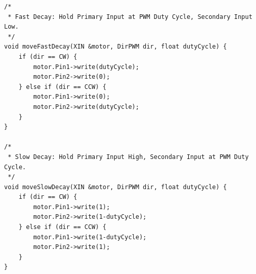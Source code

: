 \documentclass{article}
\begin{document}
\begin{lstlisting}[caption={Arduino Motor PWM Firmware Implementation}, label={lst:arduino_pwm_code}]
/*
 * Fast Decay: Hold Primary Input at PWM Duty Cycle, Secondary Input Low.
 */
void moveFastDecay(XIN &motor, DirPWM dir, float dutyCycle) {
    if (dir == CW) {
        motor.Pin1->write(dutyCycle);
        motor.Pin2->write(0);
    } else if (dir == CCW) {
        motor.Pin1->write(0);
        motor.Pin2->write(dutyCycle);
    }
}

/*
 * Slow Decay: Hold Primary Input High, Secondary Input at PWM Duty Cycle.
 */
void moveSlowDecay(XIN &motor, DirPWM dir, float dutyCycle) {
    if (dir == CW) {
        motor.Pin1->write(1);
        motor.Pin2->write(1-dutyCycle);
    } else if (dir == CCW) {
        motor.Pin1->write(1-dutyCycle);
        motor.Pin2->write(1);
    }
}
\end{lstlisting}
\end{document}
